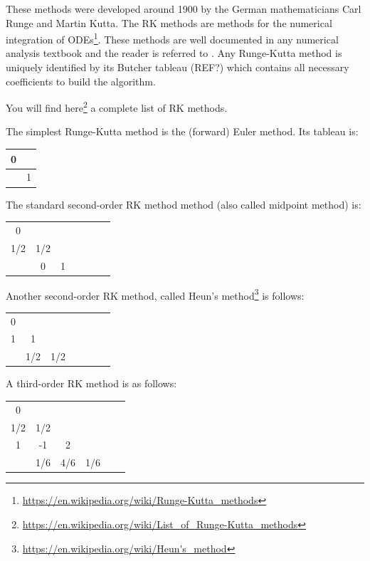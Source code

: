 These methods were developed around 1900 by the German mathematicians Carl Runge and Martin Kutta.
The RK methods are methods for the numerical integration of 
ODEs\footnote{\url{https://en.wikipedia.org/wiki/Runge-Kutta_methods}}. These methods are well 
documented in any numerical analysis textbook and the reader is referred to \cite{gery10,tack10}.
Any Runge-Kutta method is uniquely identified by its Butcher tableau (REF?) which contains 
all necessary coefficients to build the algorithm.

You will find here\footnote{\url{https://en.wikipedia.org/wiki/List_of_Runge-Kutta_methods}}
a complete list of RK methods.

The simplest Runge-Kutta method is the (forward) Euler method. Its tableau is:

\begin{mdframed}[backgroundcolor=blue!5]
\begin{tabular}{c|c}
0 & \\
\hline
 & 1
\end{tabular}
\end{mdframed}

 
The standard second-order RK method method (also called midpoint method) is:

\begin{mdframed}[backgroundcolor=blue!5]
\begin{tabular}{c|cccccc}
0 & \\
1/2 & 1/2 \\
\hline
 & 0 & 1 
\end{tabular}
\end{mdframed}

Another second-order RK method, called Heun's 
method\footnote{\url{https://en.wikipedia.org/wiki/Heun's_method}} is follows:

\begin{mdframed}[backgroundcolor=blue!5]
\begin{tabular}{c|cccccc}
0 & \\
1 & 1 \\
\hline
 & 1/2 & 1/2 
\end{tabular}
\end{mdframed}

A third-order RK method is as follows:

\begin{mdframed}[backgroundcolor=blue!5]
\begin{tabular}{c|ccccc}
0 & \\
1/2 & 1/2 \\
1 & -1 & 2 \\ 
\hline
 & 1/6 & 4/6  & 1/6
\end{tabular}
\end{mdframed}


